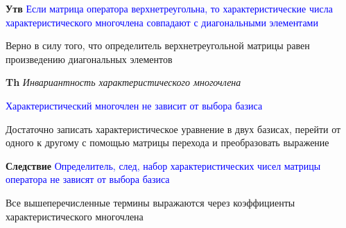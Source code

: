 \textbf{Утв} \textcolor{blue}{Если матрица оператора верхнетреугольна, то характеристические числа
характеристического многочлена совпадают с диагональными элементами}

Верно в силу того, что определитель верхнетреугольной матрицы равен произведению диагональных элементов

\textbf{Th} \textit{Инвариантность характеристического многочлена}

\textcolor{blue}{Характеристический многочлен не зависит от выбора базиса}

Достаточно записать характеристическое уравнение в двух базисах, перейти от одного к другому с помощью матрицы
перехода и преобразовать выражение

\textbf{Следствие} \textcolor{blue}{Определитель, след, набор характеристических чисел матрицы оператора не
зависят от выбора базиса}

Все вышеперечисленные термины выражаются через коэффициенты характеристического многочлена